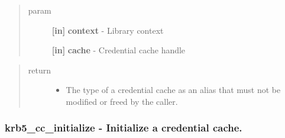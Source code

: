 \documentclass[letterpaper,10pt,english]{sphinxmanual}
\begin{document}
\begin{quote}\begin{description}
\item[{param}] \leavevmode
\textbf{{[}in{]}} \textbf{context} - Library context

\textbf{{[}in{]}} \textbf{cache} - Credential cache handle

\end{description}\end{quote}
\begin{quote}\begin{description}
\item[{return}] \leavevmode\begin{itemize}
\item {} 
The type of a credential cache as an alias that must not be modified or freed by the caller.

\end{itemize}

\end{description}\end{quote}


\subsubsection{krb5\_cc\_initialize -  Initialize a credential cache.}
\label{appdev/refs/api/krb5_cc_initialize::doc}\label{appdev/refs/api/krb5_cc_initialize:krb5-cc-initialize-initialize-a-credential-cache}

\begin{fulllineitems}
\label{appdev/refs/api/krb5_cc_initialize:c.krb5_cc_initialize}
\end{fulllineitems}
\end{document}
